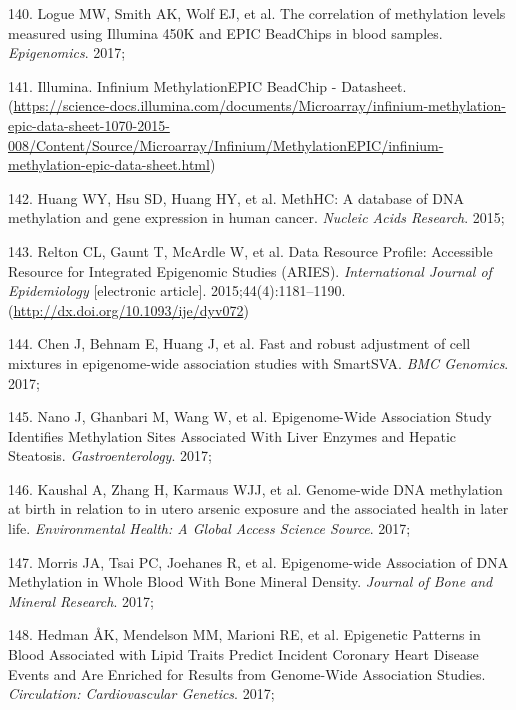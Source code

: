 \documentclass[11pt,oneside]{bristolthesis}
\newenvironment{cslreferences}%
  {}%
  {\par}
\begin{document}
\begin{cslreferences}
\leavevmode\hypertarget{ref-Logue2017}{}%
140. Logue MW, Smith AK, Wolf EJ, et al. The correlation of methylation levels measured using Illumina 450K and EPIC BeadChips in blood samples. \emph{Epigenomics}. 2017;

\leavevmode\hypertarget{ref-IlluminaEPIC}{}%
141. Illumina. Infinium MethylationEPIC BeadChip - Datasheet. (\url{https://science-docs.illumina.com/documents/Microarray/infinium-methylation-epic-data-sheet-1070-2015-008/Content/Source/Microarray/Infinium/MethylationEPIC/infinium-methylation-epic-data-sheet.html})

\leavevmode\hypertarget{ref-Huang2015}{}%
142. Huang WY, Hsu SD, Huang HY, et al. MethHC: A database of DNA methylation and gene expression in human cancer. \emph{Nucleic Acids Research}. 2015;

\leavevmode\hypertarget{ref-Relton2015-aries}{}%
143. Relton CL, Gaunt T, McArdle W, et al. Data Resource Profile: Accessible Resource for Integrated Epigenomic Studies (ARIES). \emph{International Journal of Epidemiology} {[}electronic article{]}. 2015;44(4):1181--1190. (\url{http://dx.doi.org/10.1093/ije/dyv072})

\leavevmode\hypertarget{ref-Chen2017}{}%
144. Chen J, Behnam E, Huang J, et al. Fast and robust adjustment of cell mixtures in epigenome-wide association studies with SmartSVA. \emph{BMC Genomics}. 2017;

\leavevmode\hypertarget{ref-Nano2017}{}%
145. Nano J, Ghanbari M, Wang W, et al. Epigenome-Wide Association Study Identifies Methylation Sites Associated With Liver Enzymes and Hepatic Steatosis. \emph{Gastroenterology}. 2017;

\leavevmode\hypertarget{ref-Kaushal2017}{}%
146. Kaushal A, Zhang H, Karmaus WJJ, et al. Genome-wide DNA methylation at birth in relation to in utero arsenic exposure and the associated health in later life. \emph{Environmental Health: A Global Access Science Source}. 2017;

\leavevmode\hypertarget{ref-Morris2017}{}%
147. Morris JA, Tsai PC, Joehanes R, et al. Epigenome-wide Association of DNA Methylation in Whole Blood With Bone Mineral Density. \emph{Journal of Bone and Mineral Research}. 2017;

\leavevmode\hypertarget{ref-Hedman2017}{}%
148. Hedman ÅK, Mendelson MM, Marioni RE, et al. Epigenetic Patterns in Blood Associated with Lipid Traits Predict Incident Coronary Heart Disease Events and Are Enriched for Results from Genome-Wide Association Studies. \emph{Circulation: Cardiovascular Genetics}. 2017;


\end{cslreferences}
\end{document}
